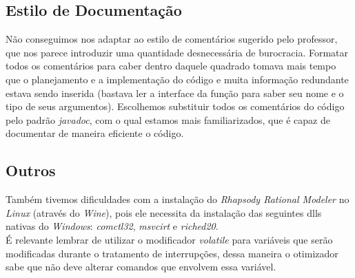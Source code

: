 \documentclass{article}
\begin{document}
\subsection{Estilo de Documentação}
Não conseguimos nos adaptar ao estilo de comentários sugerido pelo professor, que nos parece introduzir uma quantidade desnecessária de burocracia. Formatar todos os comentários para caber dentro daquele quadrado tomava mais tempo que o planejamento e a implementação do código e muita informação redundante estava sendo inserida (bastava ler a interface da função para saber seu nome e o tipo de seus argumentos). Escolhemos substituir todos os comentários do código pelo padrão \textit{javadoc}, com o qual estamos mais familiarizados, que é capaz de documentar de maneira eficiente o código.

\subsection{Outros}
Também tivemos dificuldades com a instalação do \textit{Rhapsody Rational Modeler} no \textit{Linux} (através do \textit{Wine}), pois ele necessita da instalação das seguintes dlls nativas do \textit{Windows}: \textit{comctl32}, \textit{msvcirt} e \textit{riched20}.\\

 É relevante lembrar de utilizar o modificador \textit{volatile} para variáveis que serão modificadas durante o tratamento de interrupções, dessa maneira o otimizador sabe que não deve alterar comandos que envolvem essa variável.
 

\begin{thebibliography}{widestlabel}
\end{thebibliography}
\pagebreak
\end{document}
